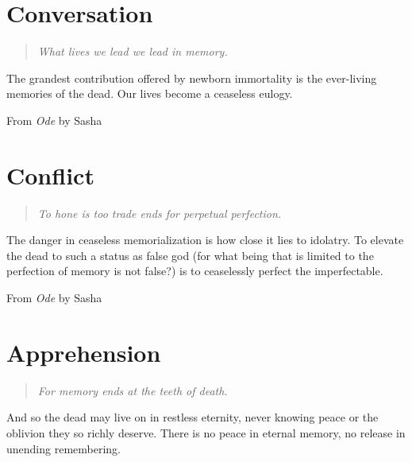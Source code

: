 \documentclass[11pt]{memoir}
\begin{document}
  \part{Conversation}
  \begin{quote}\itshape
    What lives we lead we lead in memory.
  \end{quote}

  \noindent The grandest contribution offered by newborn immortality is the ever-living memories of the dead. Our lives become a ceaseless eulogy.

  \vspace{1em}

  From \emph{Ode} by Sasha
  \vfill

  
  
  
  
  
  
  
  

  \part{Conflict}
  \begin{quote}\itshape
    To hone is too trade ends for perpetual perfection.
  \end{quote}
  
  \noindent The danger in ceaseless memorialization is how close it lies to idolatry. To elevate the dead to such a status as false god (for what being that is limited to the perfection of memory is not false?) is to ceaselessly perfect the imperfectable.

  \vspace{1em}

  From \emph{Ode} by Sasha
  \vfill

  
  
  
  
  
  
  
  
  

  \part{Apprehension}
  \begin{quote}\itshape
    For memory ends at the teeth of death.
  \end{quote}
  
  \noindent And so the dead may live on in restless eternity, never knowing peace or the oblivion they so richly deserve. There is no peace in eternal memory, no release in unending remembering.
\end{document}
